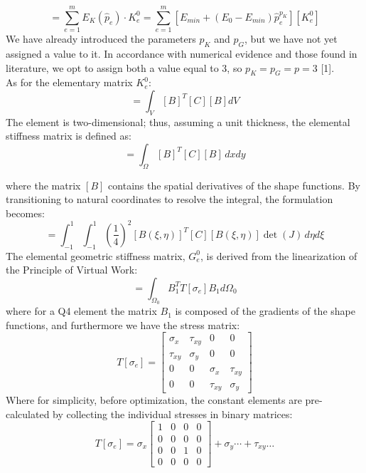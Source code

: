 \documentclass{article}
\begin{document}
\begin{equation}
[K] = \sum_{e=1}^{m} E_K(\hat{p}_e) \cdot K_e^0 = \sum_{e=1}^{m} [E_{min} + (E_0 - E_{min})\hat{p}_e^{p_K}][K_e^0]
\end{equation}
\noindent We have already introduced the parameters $p_K$ and $p_G$, but we have not yet assigned a value to it. In accordance with numerical evidence and those found in literature, we opt to assign both a value equal to 3, so $p_K = p_G = p = 3$ [1]. \\
\noindent As for the elementary matrix $K_e^0$:
\begin{equation}
[K_e^0] = \int_V [B]^T [C] [B] dV
\end{equation}
\noindent The element is two-dimensional; thus, assuming a unit thickness, the elemental stiffness matrix is defined as:
\begin{equation}
[K_e^0] = \int_\Omega [B]^T [C] [B] \, dxdy
\end{equation}

where the matrix $[B]$ contains the spatial derivatives of the shape functions. By transitioning to natural coordinates to resolve the integral, the formulation becomes:
\begin{equation}
[K_e^0] = \int_{-1}^{1} \int_{-1}^{1} \left(\frac{1}{4}\right)^2 [B(\xi, \eta)]^T [C] [B(\xi, \eta)] \det(J) \, d\eta d\xi
\end{equation}
\noindent The elemental geometric stiffness matrix, $G_e^0$, is derived from the linearization of the Principle of Virtual Work:
\begin{equation}
[G_e^0] = \int_{\Omega_0} B_1^T T[\sigma_e] B_1 d\Omega_0
\end{equation}
\noindent where for a Q4 element the matrix $B_1$ is composed of the gradients of the shape functions, and furthermore we have the stress matrix:
\begin{equation}
T[\sigma_e] = \begin{bmatrix} \sigma_x & \tau_{xy} & 0 & 0 \\ \tau_{xy} & \sigma_y & 0 & 0 \\ 0 & 0 & \sigma_x & \tau_{xy} \\ 0 & 0 & \tau_{xy} & \sigma_y \end{bmatrix}
\end{equation}
\noindent Where for simplicity, before optimization, the constant elements are pre-calculated by collecting the individual stresses in binary matrices:
\begin{equation}
T[\sigma_e] = \sigma_x \begin{bmatrix} 1 & 0 & 0 & 0 \\ 0 & 0 & 0 & 0 \\ 0 & 0 & 1 & 0 \\ 0 & 0 & 0 & 0 \end{bmatrix} + \sigma_y \cdots + \tau_{xy} \dots
\end{equation}
\end{document}
